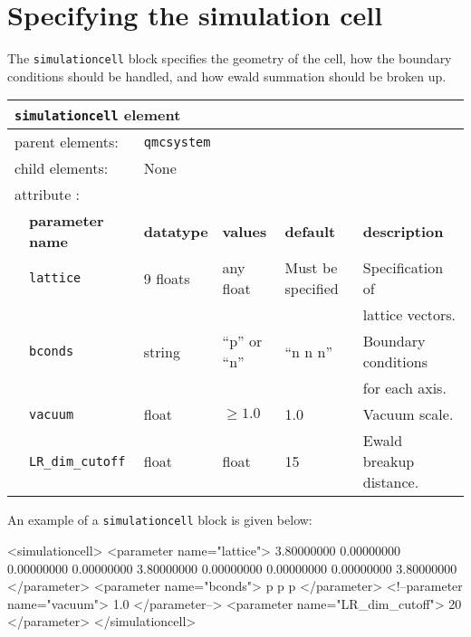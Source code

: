 \section{Specifying the simulation cell}
\label{chap:simulationcell}

The \texttt{simulationcell} block specifies the geometry of the cell, how the boundary conditions should be handled, and how ewald summation should be broken up.

\begin{table}[h]
\begin{center}
\begin{tabularx}{\textwidth}{l l l l l l }
\hline
\multicolumn{6}{l}{\texttt{simulationcell} element} \\
\hline
\multicolumn{2}{l}{parent elements:} & \multicolumn{4}{l}{\texttt{qmcsystem}}\\
\multicolumn{2}{l}{child  elements:} & \multicolumn{4}{l}{None}\\
\multicolumn{2}{l}{attribute      :} & \multicolumn{4}{l}{}\\
   &   \bfseries parameter name            & \bfseries datatype & \bfseries values & \bfseries default   & \bfseries description \\
\hline
   &   \texttt{lattice}  & 9 floats & any float & Must be specified & Specification of \\
   &                     &        &             &                   & lattice vectors. \\
   &   \texttt{bconds}   & string & ``p'' or ``n''  & ``n n n'' & Boundary conditions \\
   &                     &        &             &           & for each axis. \\
   &   \texttt{vacuum} & float & $\ge 1.0$ & 1.0        & Vacuum scale. \\
   &   \texttt{LR\_dim\_cutoff} & float & float & 15        & Ewald breakup distance. \\
\hline
\end{tabularx}
\end{center}
\end{table}

An example of a \texttt{simulationcell} block is given below:
\begin{shade}
  <simulationcell>
    <parameter name="lattice">
      3.80000000       0.00000000       0.00000000
      0.00000000       3.80000000       0.00000000
      0.00000000       0.00000000       3.80000000
    </parameter>
    <parameter name="bconds">
       p p p
    </parameter>
    <!--parameter name="vacuum"> 1.0 </parameter-->
    <parameter name="LR_dim_cutoff"> 20 </parameter>
  </simulationcell>
\end{shade}

